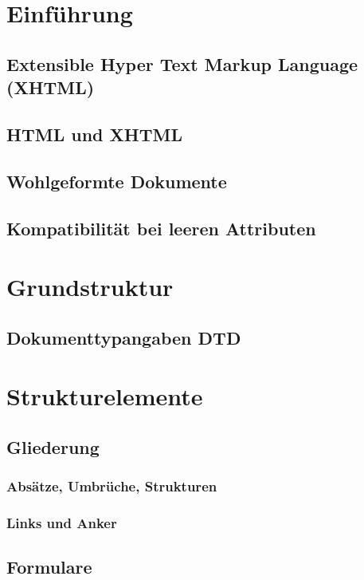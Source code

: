 \section{Einführung}
\subsection{Extensible Hyper Text Markup Language (XHTML)}
\subsection{HTML und XHTML}
\subsection{Wohlgeformte Dokumente}
\subsection{Kompatibilität bei leeren Attributen}

\section{Grundstruktur}
\subsection{Dokumenttypangaben DTD}

\section{Strukturelemente}
\subsection{Gliederung}
\subsubsection{Absätze, Umbrüche, Strukturen}
\subsubsection{Links und Anker}
\subsection{Formulare}
